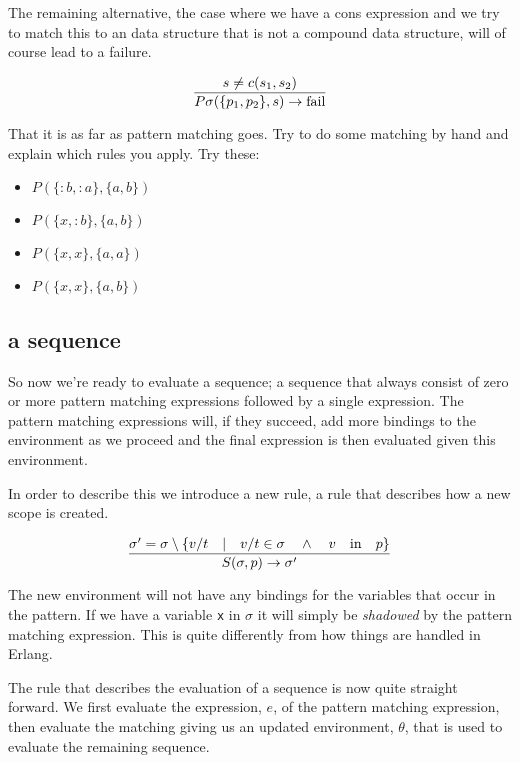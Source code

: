 \documentclass[a4paper,11pt]{article}
\begin{document}
The remaining alternative, the case where we have a cons expression and
we try to match this to an data structure that is not a compound data
structure, will of course lead to a failure.

$$\frac{s \not = c(s_1, s_2)}{P\sigma(\lbrace p_1, p_2 \rbrace, s) \rightarrow {\rm fail}}$$

That it is as far as pattern matching goes. Try to do some matching by
hand and explain which rules you apply. Try these:

\begin{itemize}
  
\item $P{}(\lbrace :b, :a \rbrace, \lbrace a, b \rbrace)$  
\item $P{}(\lbrace x, :b \rbrace, \lbrace a, b \rbrace)$
\item $P{}(\lbrace x, x \rbrace, \lbrace a, a \rbrace)$
\item $P{}(\lbrace x, x \rbrace, \lbrace a, b \rbrace)$
\end{itemize}


\subsection{a sequence}

So now we're ready to evaluate a sequence; a sequence that always
consist of zero or more pattern matching expressions followed by a
single expression. The pattern matching expressions will, if they
succeed, add more bindings to the environment as we proceed and the
final expression is then evaluated given this environment.

In order to describe this we introduce a new rule, a rule that
describes how a new scope is created.

$$\frac{\sigma' = \sigma \setminus \lbrace v/t \quad | \quad v/t \in \sigma \quad \wedge \quad  v \quad {\rm in} \quad p\rbrace}{S(\sigma, p) \rightarrow \sigma'}$$

The new environment will not have any bindings for the variables that
occur in the pattern. If we have a variable {\tt x} in $\sigma$ it
will simply be {\em shadowed} by the pattern matching expression.
This is quite differently from how things are handled in 
Erlang.

The rule that describes the evaluation of a sequence is now quite
straight forward. We first evaluate the expression, $e$, of the
pattern matching expression, then evaluate the matching giving us an
updated environment, $\theta$, that is used to evaluate the remaining
sequence. 
\end{document}
